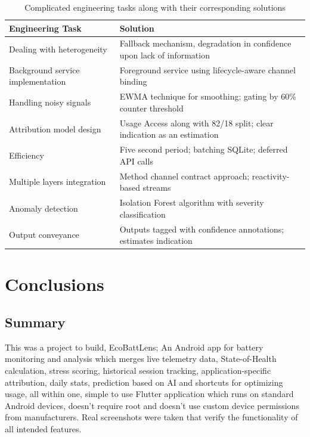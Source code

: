 \documentclass[12pt,a4paper]{report}
\begin{document}
\begin{table}[H]
\caption{Complicated engineering tasks along with their corresponding solutions}
\centering
\small
\begin{tabular}{ll}
\toprule
\textbf{Engineering Task} & \textbf{Solution}\\
\midrule
Dealing with heterogeneity     & Fallback mechanism, degradation in confidence upon lack of information\\
Background service implementation  & Foreground service using lifecycle-aware channel binding\\
Handling noisy signals           & EWMA technique for smoothing; gating by 60\% counter threshold\\
Attribution model design        & Usage Access along with 82/18 split; clear indication as an estimation\\
Efficiency                     & Five second period; batching SQLite; deferred API calls\\
Multiple layers integration     & Method channel contract approach; reactivity-based streams\\
Anomaly detection              & Isolation Forest algorithm with severity classification\\
Output conveyance              & Outputs tagged with confidence annotations; estimates indication\\
\bottomrule
\end{tabular}
\end{table}

\chapter{Conclusions}

\section{Summary}

This was a project to build, EcoBattLens; An Android app for battery monitoring and analysis which merges live telemetry data, State-of-Health calculation, stress scoring, historical session tracking, application-specific attribution, daily stats, prediction based on AI and shortcuts for optimizing usage, all within one, simple to use Flutter application which runs on standard Android devices, doesn't require root and doesn't use custom device permissions from manufacturers. Real screenshots were taken that verify the functionality of all intended features.
\end{document}
